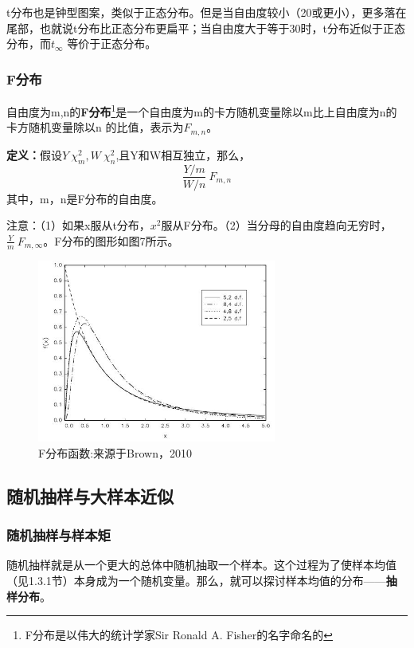 \documentclass[cn,10pt,math=newtx,citestyle=gb7714-2015,bibstyle=gb7714-2015]{elegantbook}
\begin{document}
	
	t分布也是钟型图案，类似于正态分布。但是当自由度较小（20或更小），更多落在尾部，也就说t分布比正态分布更扁平；当自由度大于等于30时，t分布近似于正态分布，而$t_{\infty}$ 等价于正态分布。
	
	\subsubsection{F分布}
	自由度为m,n的\textbf{F分布}\footnote{F分布是以伟大的统计学家Sir Ronald A. Fisher的名字命名的}是一个自由度为m的卡方随机变量除以m比上自由度为n的卡方随机变量除以n 的比值，表示为$F_{m,n}$。
	
	\textbf{定义：}假设$Y~\chi_m^2,W~\chi_n^2$,且Y和W相互独立，那么，
	\begin{equation}
		\frac{Y/m}{W/n}~F_{m,n}
	\end{equation}
	其中，m，n是F分布的自由度。
	
	注意：（1）如果x服从t分布，$x^2$服从F分布。（2）当分母的自由度趋向无穷时，$\frac{Y}{m}~F_{m,\infty}$。F分布的图形如图7所示。
	\begin{figure}[htbp]
	\centering
	\includegraphics[width=0.7\textwidth]{F.jpg}
	\caption{F分布函数:来源于Brown，2010}\label{fig:digit}
\end{figure}


	
	\subsection{随机抽样与大样本近似}
	\subsubsection{随机抽样与样本矩}
	随机抽样就是从一个更大的总体中随机抽取一个样本。这个过程为了使样本均值（见1.3.1节）本身成为一个随机变量。那么，就可以探讨样本均值的分布——\textbf{抽样分布}。
	
\end{document}
